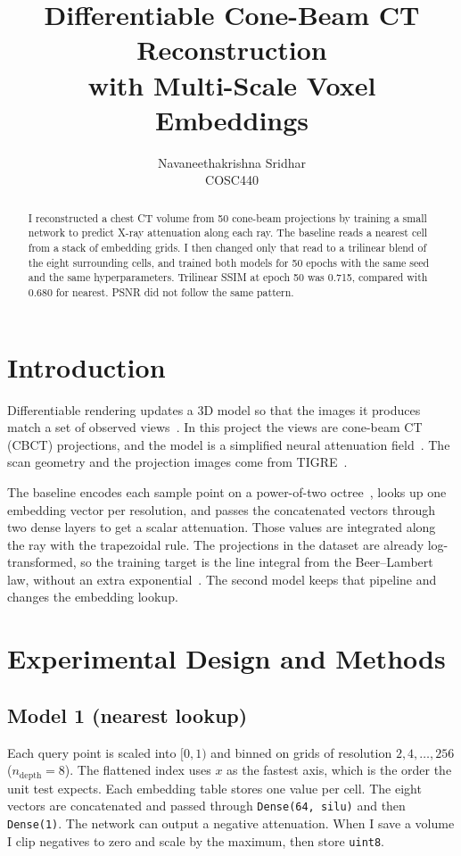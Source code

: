 \documentclass[11pt,a4paper]{article}
\title{Differentiable Cone-Beam CT Reconstruction\\
with Multi-Scale Voxel Embeddings}
\author{Navaneethakrishna Sridhar\\ COSC440}
\date{}
\begin{document}
\maketitle

\begin{abstract}
\noindent
I reconstructed a chest CT volume from 50 cone-beam projections by training a small network to predict X-ray attenuation along each ray.
The baseline reads a nearest cell from a stack of embedding grids.
I then changed only that read to a trilinear blend of the eight surrounding cells, and trained both models for 50 epochs with the same seed and the same hyperparameters.
Trilinear SSIM at epoch 50 was 0.715, compared with 0.680 for nearest.
PSNR did not follow the same pattern.
\end{abstract}

\section{Introduction}
Differentiable rendering updates a 3D model so that the images it produces match a set of observed views~\cite{atlasprojectslides2026}.
In this project the views are cone-beam CT (CBCT) projections, and the model is a simplified neural attenuation field~\cite{cosc440brief2026,zha2022naf}.
The scan geometry and the projection images come from TIGRE~\cite{tigre}.

The baseline encodes each sample point on a power-of-two octree~\cite{atlasprojectslides2026}, looks up one embedding vector per resolution, and passes the concatenated vectors through two dense layers to get a scalar attenuation.
Those values are integrated along the ray with the trapezoidal rule.
The projections in the dataset are already log-transformed, so the training target is the line integral from the Beer--Lambert law, without an extra exponential~\cite{cosc440brief2026,atlasprojectslides2026}.
The second model keeps that pipeline and changes the embedding lookup.

\section{Experimental Design and Methods}
\subsection{Model 1 (nearest lookup)}
Each query point is scaled into \([0, 1)\) and binned on grids of resolution \(2, 4, \ldots, 256\) (\(n_{\mathrm{depth}} = 8\)).
The flattened index uses \(x\) as the fastest axis, which is the order the unit test expects.
Each embedding table stores one value per cell.
The eight vectors are concatenated and passed through \texttt{Dense(64, silu)} and then \texttt{Dense(1)}.
The network can output a negative attenuation.
When I save a volume I clip negatives to zero and scale by the maximum, then store \texttt{uint8}.
\end{document}
